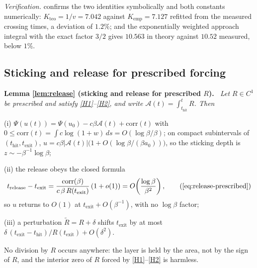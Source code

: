 \documentclass[11pt]{article}
\theoremstyle{definition}
\theoremstyle{remark}
\newcommand{\thit}{t_{\mathrm{hit}}}
\newcommand{\texit}{t_{\mathrm{exit}}}
\newcommand{\trel}{t_{\mathrm{release}}}
\newcommand{\Ar}{\mathcal{A}}                      %
\newenvironment{lemmarep}[2]{%
  \par\medskip\noindent\textbf{Lemma \ref{#1} (#2).}\itshape\ \ignorespaces}%
  {\par\medskip}
\begin{document}
\noindent\emph{Verification.}  confirms the two
identities symbolically and both constants numerically:
$K_{\mathrm{teo}}=1/v=7.042$ against $K_{\mathrm{emp}}=7.127$ refitted from the
measured crossing times, a deviation of $1.2\%$; and the exponentially weighted
approach integral with the exact factor $3/2$ gives $10.563$ in theory against
$10.52$ measured, below $1\%$.

\subsection{Sticking and release for prescribed forcing}\label{app:L4}

\begin{lemmarep}{lem:release}{sticking and release for prescribed $R$}
Let $R\in C^1$ be prescribed and satisfy \eqref{H1}--\eqref{H2}, and write
$\Ar(t)=\int_{\thit}^{t}R$. Then

(i) $\Psi(u(t))=\Psi(u_0)-c\beta\Ar(t)+\mathrm{corr}(t)$ with
$0\le\mathrm{corr}(t)=\int c\log(1+w)\,ds=O(\log\beta/\beta)$; on compact
subintervals of $(\thit,\texit)$,
$u=c\beta|\Ar(t)|\bigl(1+O(\log\beta/(\beta a_0))\bigr)$, so the sticking depth is
$z\sim-\beta^{-1}\log\beta$;

(ii) the release obeys the closed formula
\begin{equation*}
\trel-\texit=\frac{\mathrm{corr}(\beta)}{c\,\beta\,R(\texit)}\,(1+o(1))
=O\!\left(\frac{\log\beta}{\beta^{2}}\right),
\tag{\ref{eq:release-prescribed}}
\end{equation*}
so $u$ returns to $O(1)$ at $\texit+O(\beta^{-1})$, with no $\log\beta$ factor;

(iii) a perturbation $\tilde R=R+\delta$ shifts $\texit$ by at most
$\delta\,(\texit-\thit)/R(\texit)+O(\delta^{2})$.

No division by $R$ occurs anywhere: the layer is held by the area, not by the
sign of $R$, and the interior zero of $R$ forced by \eqref{H1}--\eqref{H2} is
harmless.
\end{lemmarep}
\end{document}
